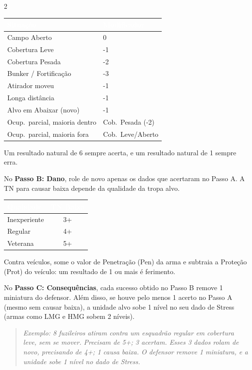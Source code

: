 \documentclass[10pt]{article}
\begin{document}
\begin{multicols}{2}
\begin{center}
\footnotesize
\setlength{\tabcolsep}{3pt}
\begin{tabular}{@{}p{2.8cm}p{2.2cm}@{}}
\toprule
\rowcolor{vinho}
\textcolor{white}{\textbf{Situação}} & \textcolor{white}{\textbf{Modificador}} \\
\midrule
Campo Aberto & 0 \\
Cobertura Leve & -1 \\
Cobertura Pesada & -2 \\
Bunker / Fortificação & -3 \\
Atirador moveu & -1 \\
Longa distância & -1 \\
Alvo em Abaixar (novo) & -1 \\
Ocup.\ parcial, maioria dentro & Cob.\ Pesada (-2) \\
Ocup.\ parcial, maioria fora & Cob.\ Leve/Aberto \\
\bottomrule
\end{tabular}
\end{center}

Um resultado natural de 6 sempre acerta, e um resultado natural de 1 sempre erra.

No \textbf{Passo B: Dano}, role de novo apenas os dados que acertaram no Passo A. A TN para causar baixa depende da qualidade da tropa alvo.

\begin{center}
\footnotesize
\setlength{\tabcolsep}{3pt}
\begin{tabular}{@{}lc@{}}
\toprule
\rowcolor{vinho}
\textcolor{white}{\textbf{Qualidade}} & \textcolor{white}{\textbf{TN Baixa}} \\
\midrule
Inexperiente & 3+ \\
Regular & 4+ \\
Veterana & 5+ \\
\bottomrule
\end{tabular}
\end{center}

Contra veículos, some o valor de Penetração (Pen) da arma e subtraia a Proteção (Prot) do veículo: um resultado de 1 ou mais é ferimento.

No \textbf{Passo C: Consequências}, cada sucesso obtido no Passo B remove 1 miniatura do defensor. Além disso, se houve pelo menos 1 acerto no Passo A (mesmo sem causar baixa), a unidade alvo sobe 1 nível no seu dado de Stress (armas como LMG e HMG sobem 2 níveis).

\begin{quote}
\itshape Exemplo: 8 fuzileiros atiram contra um esquadrão regular em cobertura leve, sem se mover. Precisam de 5+; 3 acertam. Esses 3 dados rolam de novo, precisando de 4+; 1 causa baixa. O defensor remove 1 miniatura, e a unidade sobe 1 nível no dado de Stress.
\end{quote}


\end{multicols}
\end{document}
